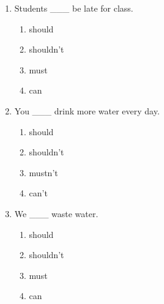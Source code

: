 \documentclass[11pt,a4paper]{ctexart}
\begin{document}
\begin{enumerate}[leftmargin=*,itemsep=4pt]
\begin{enumerate}[label=\Alph*.,leftmargin=2em,itemsep=1pt,topsep=2pt]
\item can’t
\end{enumerate}
\item Students \_\_\_ be late for class.
\begin{enumerate}[label=\Alph*.,leftmargin=2em,itemsep=1pt,topsep=2pt]
\item should
\item shouldn’t
\item must
\item can
\end{enumerate}
\item You \_\_\_ drink more water every day.
\begin{enumerate}[label=\Alph*.,leftmargin=2em,itemsep=1pt,topsep=2pt]
\item should
\item shouldn’t
\item mustn’t
\item can’t
\end{enumerate}
\item We \_\_\_ waste water.
\begin{enumerate}[label=\Alph*.,leftmargin=2em,itemsep=1pt,topsep=2pt]
\item should
\item shouldn’t
\item must
\item can
\end{enumerate}
\end{enumerate}
\end{document}
